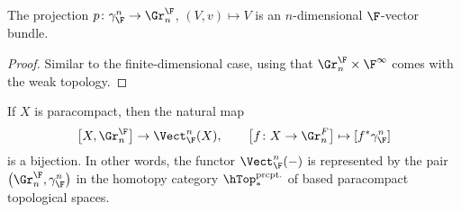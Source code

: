 \begin{lemma}
	The projection $p\colon \gamma^n_{\F} \to \Gr_n^{\F}$, $(V, v) \mapsto V$ is an $n$-dimensional $\F$-vector bundle.
\end{lemma}
\begin{proof}
	Similar to the finite-dimensional case, using that $\Gr_n^{\F} \times \F^\infty$ comes with the weak topology.
\end{proof}
\begin{theorem}
	If $X$ is paracompact, then the natural map
	\begin{equation*}
		\big[X, \Gr_n^{\F}\big] \to \Vect_{\F}^n(X), \qquad \big[f\colon X \to \Gr^{F}_n\big] \mapsto [f^* \gamma_{\F}^n]
	\end{equation*}
	is a bijection.
	In other words, the functor $\Vect_{\F}^n({{-}})$ is represented by the pair $\big(\Gr_n^{\F}, \gamma_{\F}^n\big)$ in the homotopy category $\hToprcpt_*$ of based paracompact topological spaces.
\end{theorem}
